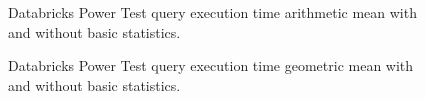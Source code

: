 \begin{figure}
   \begin{center}
   \end{center}
   \caption{Databricks Power Test query execution time arithmetic mean with and without basic statistics.}
   \label{fig:additionalResultsDatabricksWithBasicStatsPowerTestArithmeticMean}
\end{figure}

\begin{figure}
   \begin{center}
   \end{center}
   \caption{Databricks Power Test query execution time geometric mean with and without basic statistics.}
   \label{fig:additionalResultsDatabricksWithBasicStatsPowerTestGeomean}
\end{figure}

